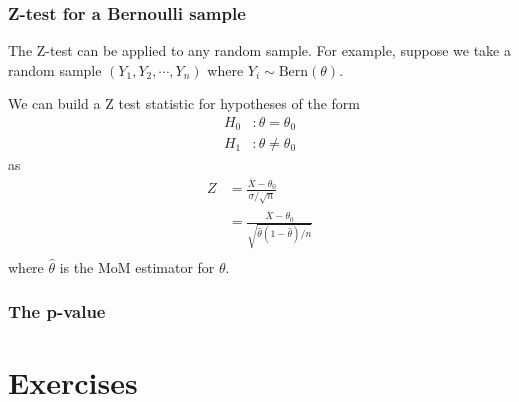 \subsubsection{Z-test for a Bernoulli sample}

The Z-test can be applied to any random sample. 
For example, suppose we take a random sample $(Y_{1}, Y_{2}, \cdots, Y_{n})$ where $Y_{i} \sim \text{Bern}(\theta)$. 

We can build a Z test statistic for hypotheses of the form
\begin{align}
    H_{0}&: \theta  = \theta_{0} \\ 
    H_{1}&: \theta  \neq \theta_{0}
\end{align}
as 
\begin{align}
    Z &= \frac{\overline{X} - \theta_{0}}{ \sigma / \sqrt{n} } \\ 
      &= \frac{\overline{X} - \theta_{0}}{ \sqrt{\hat{\theta}(1-\hat{\theta}) / n} } \\ 
\end{align}
where $\hat{\theta}$ is the MoM estimator for $\theta$.


\subsubsection{The p-value}


\section{Exercises}

